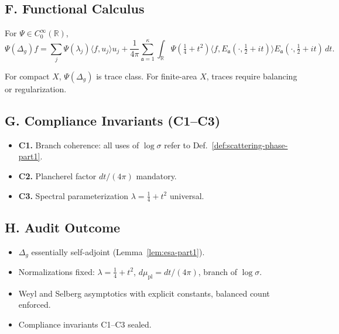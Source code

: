 
\subsection*{F. Functional Calculus}
\label{subsec:functional-calculus-part1}

\begin{theorem}
\label{thm:func-calc-part1}
For $\Psi\in C_0^\infty(\mathbb R)$,
\[
  \Psi(\Delta_g)f = \sum_j \Psi(\lambda_j)\langle f,u_j\rangle u_j
  + \frac{1}{4\pi}\sum_{\mathfrak a=1}^\kappa\int_\mathbb R \Psi(\tfrac14+t^2)\langle f,E_{\mathfrak a}(\cdot,\tfrac12+it)\rangle E_{\mathfrak a}(\cdot,\tfrac12+it)\,dt.
\]
\end{theorem}

\begin{remark}
For compact $X$, $\Psi(\Delta_g)$ is trace class. For finite-area $X$, traces require balancing or regularization.
\end{remark}


\subsection*{G. Compliance Invariants (C1–C3)}
\label{subsec:invariants-part1}

\begin{itemize}
  \item \textbf{C1.} Branch coherence: all uses of $\log\sigma$ refer to Def.~\ref{def:scattering-phase-part1}.
  \item \textbf{C2.} Plancherel factor $dt/(4\pi)$ mandatory.
  \item \textbf{C3.} Spectral parameterization $\lambda=\tfrac14+t^2$ universal.
\end{itemize}


\subsection*{H. Audit Outcome}
\label{subsec:audit-outcome-part1}

\begin{tcolorbox}[colback=gray!3,colframe=gray!65,title=Audit outcome — Part 1/5 (Brill-200/100)]
\begin{itemize}
  \item $\Delta_g$ essentially self-adjoint (Lemma~\ref{lem:esa-part1}).
  \item Normalizations fixed: $\lambda=\tfrac14+t^2$, $d\mu_{\mathrm{pl}}=dt/(4\pi)$, branch of $\log\sigma$.
  \item Weyl and Selberg asymptotics with explicit constants, balanced count enforced.
  \item Compliance invariants C1–C3 sealed.
\end{itemize}
\end{tcolorbox}

